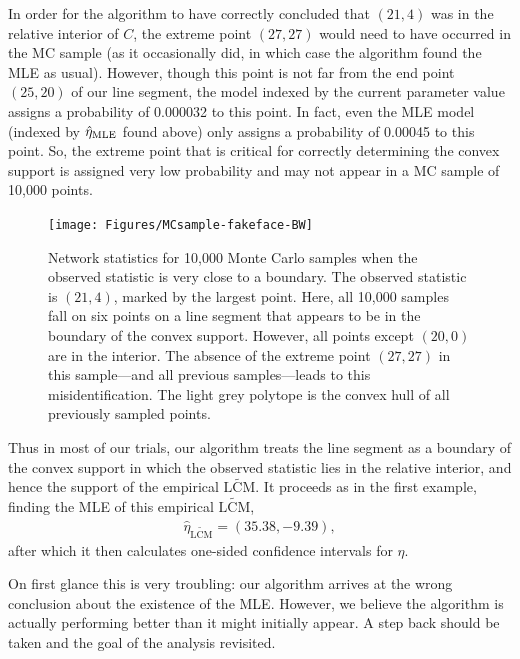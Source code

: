 In order for the algorithm to have correctly concluded that $(21,4)$ was in the 
relative interior of $C$, the extreme point $(27,27)$ 
would need to have occurred in the MC sample
(as it occasionally did, in which case the algorithm found the MLE as usual).  
However, though this point is not far from the end point $(25,20)$ of our line
segment, the model indexed by the current parameter value 
assigns a probability of 0.000032 to this point.  In fact, even the 
MLE model (indexed by $\hat{\eta}_{\textrm{MLE}}$ found above) only assigns a probability of 0.00045 to this point.  
So, the extreme point that is critical for correctly determining the convex support 
is assigned very low probability and may not appear in a MC sample of 10,000 points.

\begin{figure}[h!]
\centering
\texttt{[image: Figures/MCsample-fakeface-BW]}
\caption[Network statistics for 10,000 MC samples when observed 
statistic is very close to a boundary]
{Network statistics for 10,000 Monte Carlo samples when the observed 
statistic is very close to a boundary.  The observed statistic is $(21,4)$, marked
by the largest point.  Here, 
all 10,000 samples fall on six points on a line segment 
that appears to be in the boundary of the convex support.  However,
all points except $(20,0)$ are in the interior.  The absence of the 
extreme point $(27,27)$ in this sample---and all previous samples---leads
to this misidentification.
The light grey polytope is the convex hull of all previously 
sampled points.}
\label{F:MC problem}
\end{figure}

Thus in most of our trials, our algorithm treats the line segment as a boundary of the 
convex support in which the observed statistic lies in the relative interior, and 
hence the support of the empirical $\widetilde{\textrm{LCM}}$.  It proceeds as in the first
example, finding the MLE of this empirical $\widetilde{\textrm{LCM}}$,
\begin{align*}
	\hat{\eta}_{\widetilde{\textrm{LCM}}} = (35.38, -9.39),
\end{align*}
after which it then calculates one-sided confidence intervals for $\eta$.

On first glance this is very troubling: our algorithm arrives at the wrong conclusion 
about the existence of the MLE.  However, we believe the algorithm is
actually performing better than it might initially appear.
A step back should be taken and the goal of the analysis revisited.  

